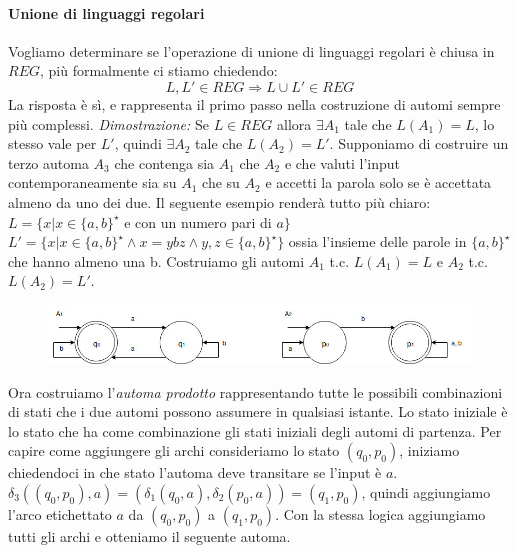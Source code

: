 \paragraph{Unione di linguaggi regolari}
Vogliamo determinare se l'operazione di unione di linguaggi regolari \`e chiusa in $REG$, pi\`u formalmente ci stiamo chiedendo:
\[
    L, L' \in REG \Rightarrow L \cup L' \in REG
\]
La risposta \`e s\`i, e rappresenta il primo passo nella costruzione di automi sempre pi\`u complessi.
\newline
\emph{Dimostrazione:} Se $L \in REG$ allora $\exists A_1$ tale che $L(A_1) = L$, lo stesso vale per $L'$, quindi $\exists A_2$ tale che $L(A_2) = L'$. Supponiamo di costruire un terzo automa $A_3$ che contenga sia $A_1$ che $A_2$ e che valuti l'input contemporaneamente sia su $A_1$ che su $A_2$ e accetti la parola solo se  \`e accettata almeno da uno dei due.
\newline
Il seguente esempio render\`a tutto pi\`u chiaro: \newline
$L = \{x | x \in \{a,b\}^{\star}$ e con un numero pari di $a \}$ \newline
$L' = \{x | x \in \{a,b\}^{\star} \land x=ybz \land y,z \in \{a,b\}^{\star} \}$ ossia l'insieme delle parole in $\{a,b\}^{\star}$ che hanno almeno una b. \newline
Costruiamo gli automi $A_1$ t.c. $L(A_1) = L$ e $A_2$ t.c. $L(A_2) = L'$. 
\begin{figure}[H]
    \includegraphics[width=1\textwidth]{a1a2}
\end{figure}
Ora costruiamo l'\emph{automa prodotto} rappresentando tutte le possibili combinazioni di stati che i due automi possono assumere in qualsiasi istante. Lo stato iniziale  \`e lo stato che ha come combinazione gli stati iniziali degli automi di partenza.\newline
Per capire come aggiungere gli archi consideriamo lo stato $(q_0, p_0)$, iniziamo chiedendoci in che stato l'automa deve transitare se l'input \`e $a$. \newline
$\delta_3((q_0, p_0),a)=(\delta_1(q_0,a),\delta_2(p_0,a))=(q_1,p_0)$, quindi aggiungiamo l'arco etichettato $a$ da $(q_0, p_0)$ a $(q_1,p_0)$. Con la stessa logica aggiungiamo tutti gli archi e otteniamo il seguente automa.\newline
